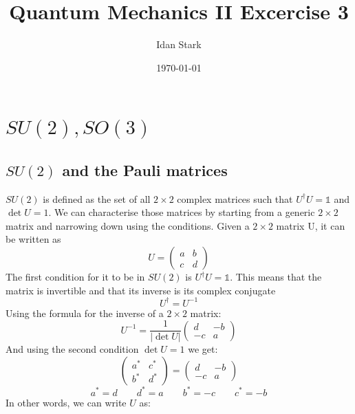 \documentclass{article}
\title{Quantum Mechanics II Excercise 3}
\author{Idan Stark}
\date{\today}
\begin{document}
\maketitle

\section{$SU(2), SO(3)$}
\subsection{$SU(2)$ and the Pauli matrices}
$SU(2)$ is defined as the set of all $2\times2$ complex matrices such that $U^\dagger U = \mathbb{1}$ and $\det U = 1$. We can characterise those matrices by starting from a generic $2\times2$ matrix and narrowing down using the conditions.
\newline
Given a $2\times2$ matrix U, it can be written as
\begin{equation}
    U = \begin{pmatrix}a & b \\ c & d\end{pmatrix}
\end{equation}
The first condition for it to be in $SU(2)$ is $U^\dagger U = \mathbb{1}$. This means that the matrix is invertible and that its inverse is its complex conjugate
\begin{equation}
    U^\dagger = U^{-1}
\end{equation}
Using the formula for the inverse of a $2\times2$ matrix:
\begin{equation}
    U^{-1} = \frac{1}{|\det U|}\begin{pmatrix} d & -b \\ -c & a \end{pmatrix}
\end{equation}
And using the second condition $\det U = 1$ we get:
\begin{equation}
    \begin{pmatrix} a^* & c^* \\ b^* & d^* \end{pmatrix}
    =
    \begin{pmatrix} d & -b \\ -c & a \end{pmatrix}
\end{equation}
\begin{equation}
    a^* = d \qquad d^* = a \qquad b^* = -c \qquad c^* = -b
\end{equation}
In other words, we can write $U$ as:
\end{document}
